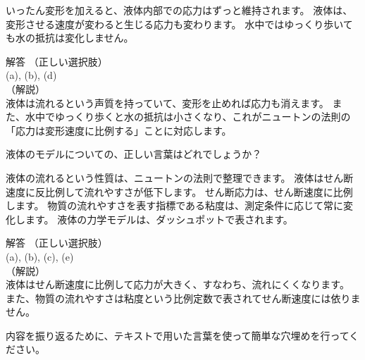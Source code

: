 \documentclass[uplatex,dvipdfmx,a4paper,11pt]{jsarticle}
\begin{document}
\begin{qlist}
\begin{qlist2}
		\qitem いったん変形を加えると、液体内部での応力はずっと維持されます。
		\qitem 液体は、変形させる速度が変わると生じる応力も変わります。
		\qitem 水中ではゆっくり歩いても水の抵抗は変化しません。
	\end{qlist2}
  \vspace{3mm}
  \begin{itembox}[l]{解答}
    （正しい選択肢）\\
    (a), (b), (d)\\
    （解説）\\
    液体は流れるという声質を持っていて、変形を止めれば応力も消えます。
    また、水中でゆっくり歩くと水の抵抗は小さくなり、これがニュートンの法則の「応力は変形速度に比例する」ことに対応します。
\end{itembox}
	\qitem 液体のモデルについての、正しい言葉はどれでしょうか？
	\begin{qlist2}
		\qitem 液体の流れるという性質は、ニュートンの法則で整理できます。
		\qitem 液体はせん断速度に反比例して流れやすさが低下します。
		\qitem せん断応力は、せん断速度に比例します。
		\qitem 物質の流れやすさを表す指標である粘度は、測定条件に応じて常に変化します。
		\qitem 液体の力学モデルは、ダッシュポットで表されます。
	\end{qlist2}
    \vspace{3mm}
    \begin{itembox}[l]{解答}
    （正しい選択肢）\\
    (a), (b), (c), (e)\\
    （解説）\\
    液体はせん断速度に比例して応力が大きく、すなわち、流れにくくなります。
    また、物質の流れやすさは粘度という比例定数で表されてせん断速度には依りません。
    \end{itembox}
\end{qlist}

内容を振り返るために、テキストで用いた言葉を使って簡単な穴埋めを行ってください。
\end{document}
